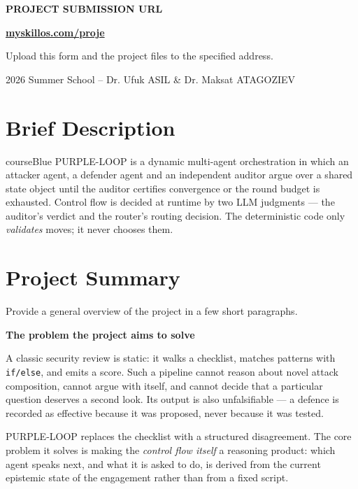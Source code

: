 \documentclass[11pt,a4paper]{article}
\newcommand{\sectionintro}[1]{\textcolor{courseGray}{\small #1}\par\vspace{2pt}}
\newcommand{\qa}[2]{\textbf{#1}\par\vspace{-2pt}\begin{answerbox}#2\end{answerbox}}
\begin{document}
\begin{titlepage}
  \vfill
  \begin{center}
    \begin{tcolorbox}[width=0.88\linewidth,colback=courseBlue!6,colframe=courseBlue,
      arc=2mm,left=2mm,right=2mm,top=1mm,bottom=1mm]
      \centering
      {\normalsize\bfseries PROJECT SUBMISSION URL}\par
      {\Large\bfseries\href{https://myskillos.com/proje}{myskillos.com/proje}}\par
      \footnotesize Upload this form and the project files to the specified address.
    \end{tcolorbox}
    {\footnotesize 2026 Summer School -- Dr. Ufuk ASIL \& Dr. Maksat ATAGOZIEV}
  \end{center}
\end{titlepage}


\section*{Brief Description}

\begin{projectbox}{courseBlue}
PURPLE-LOOP is a dynamic multi-agent orchestration in which an attacker agent, a defender
agent and an independent auditor argue over a shared state object until the auditor
certifies convergence or the round budget is exhausted. Control flow is decided at runtime
by two LLM judgments --- the auditor's verdict and the router's routing decision. The
deterministic code only \emph{validates} moves; it never chooses them.
\end{projectbox}

\tableofcontents
\newpage

\section{Project Summary}
\sectionintro{Provide a general overview of the project in a few short paragraphs.}

\qa{The problem the project aims to solve}{%
A classic security review is static: it walks a checklist, matches patterns with
\texttt{if/else}, and emits a score. Such a pipeline cannot reason about novel attack
composition, cannot argue with itself, and cannot decide that a particular question
deserves a second look. Its output is also unfalsifiable --- a defence is recorded as
effective because it was proposed, never because it was tested.

PURPLE-LOOP replaces the checklist with a structured disagreement. The core problem it
solves is making the \emph{control flow itself} a reasoning product: which agent speaks
next, and what it is asked to do, is derived from the current epistemic state of the
engagement rather than from a fixed script.}
\end{document}
